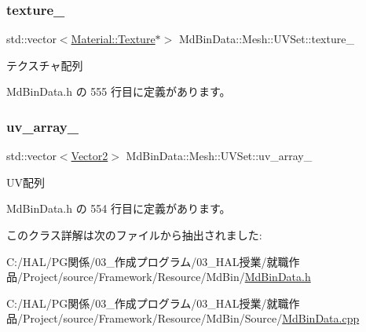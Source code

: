 \subsubsection{\texorpdfstring{texture\+\_\+}{texture\_}}
{\footnotesize\ttfamily std\+::vector$<$\mbox{\hyperlink{class_md_bin_data_1_1_material_1_1_texture}{Material\+::\+Texture}}$\ast$$>$ Md\+Bin\+Data\+::\+Mesh\+::\+U\+V\+Set\+::texture\+\_\+\hspace{0.3cm}{\ttfamily [private]}}



テクスチャ配列 



 Md\+Bin\+Data.\+h の 555 行目に定義があります。

\mbox{\label{class_md_bin_data_1_1_mesh_1_1_u_v_set_a536dede8f5757658f374d561473cb935}} 
\subsubsection{\texorpdfstring{uv\+\_\+array\+\_\+}{uv\_array\_}}
{\footnotesize\ttfamily std\+::vector$<$\mbox{\hyperlink{class_md_bin_data_1_1_vector2}{Vector2}}$>$ Md\+Bin\+Data\+::\+Mesh\+::\+U\+V\+Set\+::uv\+\_\+array\+\_\+\hspace{0.3cm}{\ttfamily [private]}}



U\+V配列 



 Md\+Bin\+Data.\+h の 554 行目に定義があります。



このクラス詳解は次のファイルから抽出されました\+:\begin{DoxyCompactItemize}
\item 
C\+:/\+H\+A\+L/\+P\+G関係/03\+\_\+作成プログラム/03\+\_\+\+H\+A\+L授業/就職作品/\+Project/source/\+Framework/\+Resource/\+Md\+Bin/\mbox{\hyperlink{_md_bin_data_8h}{Md\+Bin\+Data.\+h}}\item 
C\+:/\+H\+A\+L/\+P\+G関係/03\+\_\+作成プログラム/03\+\_\+\+H\+A\+L授業/就職作品/\+Project/source/\+Framework/\+Resource/\+Md\+Bin/\+Source/\mbox{\hyperlink{_md_bin_data_8cpp}{Md\+Bin\+Data.\+cpp}}\end{DoxyCompactItemize}
